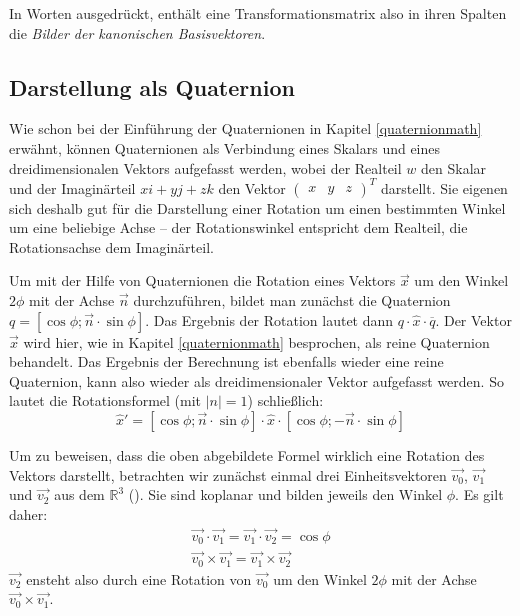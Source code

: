 In Worten ausgedrückt, enthält eine Transformationsmatrix also in ihren Spalten die \emph{Bilder der kanonischen Basisvektoren}.

\subsection{Darstellung als Quaternion}
Wie schon bei der Einführung der Quaternionen in Kapitel \ref{quaternionmath} erwähnt, können Quaternionen als Verbindung eines Skalars und eines dreidimensionalen Vektors aufgefasst werden, wobei der Realteil $w$ den Skalar und der Imaginärteil $xi + yj + zk$ den Vektor $\begin{pmatrix}x & y & z\end{pmatrix}^T$ darstellt. Sie eigenen sich deshalb gut für die Darstellung einer Rotation um einen bestimmten Winkel um eine beliebige Achse -- der Rotationswinkel entspricht dem Realteil, die Rotationsachse dem Imaginärteil.

Um mit der Hilfe von Quaternionen die Rotation eines Vektors $\vec x$ um den Winkel $2 \phi$ mit der Achse $\vec n$ durchzuführen, bildet man zunächst die Quaternion $q = \left[ \cos \phi; \vec n \cdot \sin \phi \right]$. Das Ergebnis der Rotation lautet dann $q \cdot \hat{x} \cdot \overline{q}$. Der Vektor $\vec x$ wird hier, wie in Kapitel \ref{quaternionmath} besprochen, als reine Quaternion behandelt. Das Ergebnis der Berechnung ist ebenfalls wieder eine reine Quaternion, kann also wieder als dreidimensionaler Vektor aufgefasst werden. So lautet die Rotationsformel (mit $\left| n \right| = 1$) schließlich:
\begin{equation}
 \hat{x}' = \left[ \cos \phi; \vec n \cdot \sin \phi \right] \cdot \hat{x} \cdot \left[ \cos \phi; -\vec n \cdot \sin \phi \right]
\end{equation}

Um zu beweisen, dass die oben abgebildete Formel wirklich eine Rotation des Vektors darstellt, betrachten wir zunächst einmal drei Einheitsvektoren $\vec{v_0}$, $\vec{v_1}$ und $\vec{v_2}$ aus dem $\mathbb R^3$ (\vgl \citep{quaternionproof}). Sie sind koplanar und bilden jeweils den Winkel $\phi$. Es gilt daher:
\begin{align}
 \vec{v_0} \cdot \vec{v_1} = \vec{v_1} \cdot \vec{v_2} = \cos \phi \label{dotsame} \\
 \vec{v_0} \times\vec{v_1} = \vec{v_1} \times \vec{v_2} \label{crosssame}
\end{align}
$\vec{v_2}$ ensteht also durch eine Rotation von $\vec{v_0}$ um den Winkel $2 \phi$ mit der Achse $\vec{v_0} \times \vec{v_1}$.

